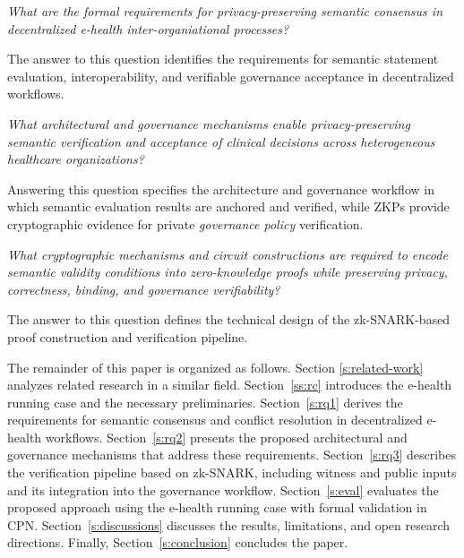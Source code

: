 \documentclass[journal]{IEEEtran}
\begin{document}
\begin{description}[leftmargin=\IEEElabelindentfactor\IEEElabelindent,
                    labelsep=0.5em, style=nextline]
\item[\textbf{RQ1}] \textit{What are the formal requirements for privacy-preserving semantic consensus in decentralized e-health inter-organiational processes?}

\noindent The answer to this question identifies the requirements for semantic statement evaluation, interoperability, and verifiable governance acceptance in decentralized workflows.

\item[\textbf{RQ2}] \textit{What architectural and governance mechanisms enable privacy-preserving semantic verification and acceptance of clinical decisions across heterogeneous healthcare organizations?}

\noindent Answering this question specifies the architecture and governance workflow in which semantic evaluation results are anchored and verified, while ZKPs provide cryptographic evidence for private \emph{governance policy} verification.

\item[\textbf{RQ3}] \textit{What cryptographic mechanisms and circuit
constructions are required to encode semantic validity conditions into
zero-knowledge proofs while preserving privacy, correctness, binding,
and governance verifiability?}

\noindent The answer to this question defines the technical design of
the zk-SNARK-based proof construction and verification pipeline.
\end{description}

The remainder of this paper is organized as follows. Section \ref{s:related-work} analyzes related research in a similar field. Section~\ref{ss:rc} introduces the e-health running case and the necessary preliminaries. Section~\ref{s:rq1} derives the requirements for semantic consensus and conflict resolution in decentralized e-health workflows. Section~\ref{s:rq2} presents the proposed architectural and governance mechanisms that address these requirements. Section~\ref{s:rq3} describes the verification pipeline based on zk-SNARK, including witness and public inputs and its integration into the governance workflow. Section~\ref{s:eval} evaluates the proposed approach using the e-health running case with formal validation in CPN. Section~\ref{s:discussions} discusses the results, limitations, and open research directions. Finally, Section~\ref{s:conclusion} concludes the paper.
\end{document}
